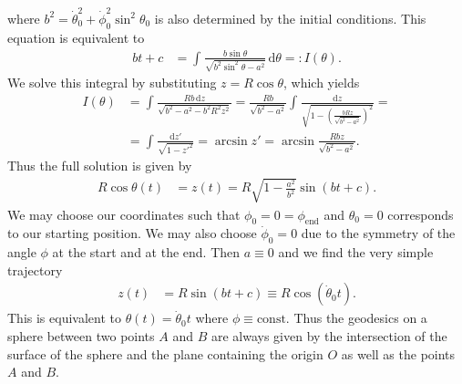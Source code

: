 \documentclass[english, parskip=full]{scrartcl}
\newcommand{\intx}{}
\newcommand{\kla}{}
\newcommand{\tecxt}{}
\begin{document}
where $b^2 = \dot{\theta}_0^2 + \dot{\phi}_0^2 \sin^2\theta_0$ is also determined by the initial conditions.
This equation is equivalent to
\begin{align}
bt + c &= \intx\int_{ }^{ } \frac{b\sin\theta}{\sqrt{b^2 \sin^2\theta - a^2}}\, \mathrm{d}\theta =: I(\theta).
\end{align}
We solve this integral by substituting $z = R\cos\theta$, which yields
\begin{align}
I(\theta) &= \intx\int_{ }^{ } \frac{Rb\,\tecxt\text{d}z}{\sqrt{b^2 - a^2 - b^2R^2z^2}} = \frac{Rb}{\sqrt{b^2 - a^2}} \intx\int_{ }^{ } \frac{\tecxt\text{d}z}{\sqrt{1 - \kla\left( \frac{bRz}{\sqrt{b^2 - a^2}} \right)^2}} = \\
&= \intx\int_{ }^{ } \frac{ \mathrm{d}z'}{\sqrt{1 - z'^2}} = \arcsin z' = \arcsin \frac{Rbz}{\sqrt{b^2 - a^2}}.
\end{align}
Thus the full solution is given by
\begin{align}
R\cos\theta(t) &= z(t) = R\sqrt{1 - \frac{a^2}{b^2}} \sin(bt +  c).
\end{align}
We may choose our coordinates such that $\phi_0 = 0 = \phi_{\tecxt\text{end}}$ and $\theta_0=0$ corresponds to our starting position.
We may also choose $\dot{\phi}_0 = 0$ due to the symmetry of the angle $\phi$ at the start and at the end.
Then $a\equiv 0$ and we find the very simple trajectory
\begin{align}
z(t) &= R\sin (bt + c) \equiv R\cos (\dot{\theta}_0 t).
\end{align}
This is equivalent to $\theta(t) = \dot{\theta}_0 t$ where $\phi \equiv\tecxt\text{const}$.
Thus the geodesics on a sphere between two points $A$ and $B$ are always given by the intersection of the surface of the sphere and the plane containing the origin $O$ as well as the points $A$ and $B$.
\end{document}
